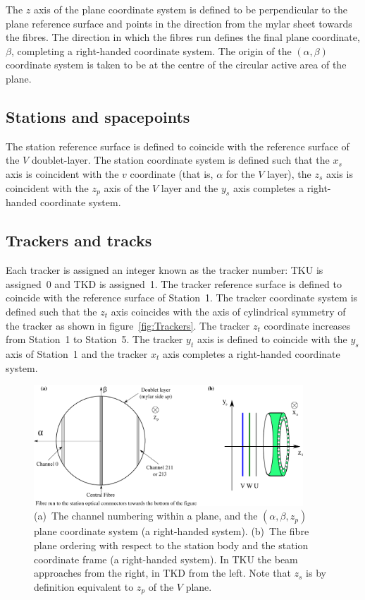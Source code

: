   The $z$ axis of the plane coordinate system is defined to be perpendicular to the plane reference surface and points in the direction from the mylar sheet towards the fibres. The direction in which the fibres run defines the final plane coordinate, $\beta$, completing a right-handed coordinate system. The origin of the $(\alpha, \beta)$ coordinate system is taken to be at the centre of the circular active area of the plane.

  \subsection{Stations and spacepoints}
  The station reference surface is defined to coincide with the reference surface of the $V$ doublet-layer. The station coordinate system is defined such that the $x_s$ axis is coincident with the $v$ coordinate (that is, $\alpha$ for the $V$ layer), the $z_s$ axis is coincident with the $z_p$ axis of the $V$ layer and the $y_s$ axis completes a right-handed coordinate system.

  \subsection{Trackers and tracks}
  Each tracker is assigned an integer known as the tracker number: TKU is assigned~0 and TKD is assigned~1. The tracker reference surface is defined to coincide with the reference surface of Station~1. The tracker coordinate system is defined such that the $z_t$ axis coincides with the axis of cylindrical symmetry of the tracker as shown in figure~\ref{fig:Trackers}. The tracker $z_t$ coordinate increases from Station~1 to Station~5. The tracker $y_t$ axis is defined to coincide with the $y_s$ axis of Station~1 and the tracker $x_t$ axis completes a right-handed coordinate system. 
  
  \begin{figure}[htb]
    \begin{center}
      \includegraphics[width=0.9\textwidth]{02-CoordinateSystems/PlaneCoordinatesAndNumbering.pdf}
      \caption{\label{fig:DoubletLayerOrder} (a)~The channel numbering within a plane, and the $(\alpha, \beta, z_p)$ plane coordinate system (a right-handed system).  (b)~The fibre plane ordering with respect to the station body and the station coordinate frame (a right-handed system).  In TKU the beam approaches from the right, in TKD from the left. Note that $z_s$ is by definition equivalent to $z_p$ of the $V$ plane.}
    \end{center}
  \end{figure}

